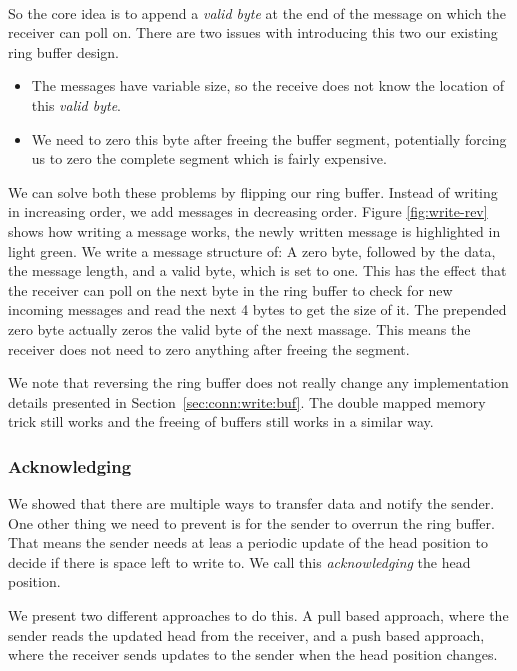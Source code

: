\paragraph{} So the core idea is to append a \emph{valid byte} at the end of the message on which the receiver can poll on.
There are two issues with introducing this two our existing ring buffer design.

\begin{itemize}
  \item The messages have variable size, so the receive does not know the location of this \emph{valid byte}.
  \item We need to zero this byte after freeing the buffer segment, potentially forcing us to zero the complete segment 
    which is fairly expensive.
\end{itemize}

We can solve both these problems by flipping our ring buffer. Instead of writing in increasing order, we add messages in 
decreasing order. Figure \ref{fig:write-rev} shows how writing a message works, the newly written message is highlighted in 
light green. We write a message structure of: 
A zero byte, followed by the data, the message length, and a valid byte, which is set to one. This has the effect that the
receiver can poll on the next byte in the ring buffer to check for new incoming messages and read the next 4 bytes to get 
the size of it. The prepended zero byte actually zeros the valid byte of the next massage. This means the receiver does not 
need to zero anything after freeing the segment.




We note that reversing the ring buffer does not really change any implementation details presented in 
Section~\ref{sec:conn:write:buf}. The double mapped memory trick still works and the freeing of buffers still works in a
similar way.

\subsubsection{Acknowledging}

We showed that there are multiple ways to transfer data and notify the sender. One other thing we need to prevent is for the
sender to overrun the ring buffer. That means the sender needs at leas a periodic update of the head position to decide if
there is space left to write to. We call this \emph{acknowledging} the head position.

We present two different approaches to do this. A pull based approach, where the sender reads the updated head from the
receiver, and a push based approach, where the receiver sends updates to the sender when the head position changes.


